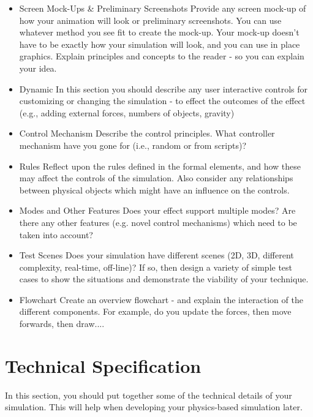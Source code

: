 \documentclass[conference]{acmsiggraph}
\begin{document}
\begin{itemize}
\item {Screen Mock-Ups \& Preliminary Screenshots}
Provide any screen mock-up of how your animation will look or preliminary screenshots.  You can use whatever method you see fit to create the mock-up.  Your mock-up doesn't have to be exactly how your simulation will look, and you can use in place graphics.  Explain principles and concepts to the reader - so you can explain your idea.
\item {Dynamic}
In this section you should describe any user interactive controls for customizing or changing the simulation - to effect the outcomes of the effect (e.g., adding external forces, numbers of objects, gravity)
\item {Control Mechanism}
Describe the control principles.  What controller mechanism have you gone for (i.e., random or from scripts)?  
\item {Rules}
Reflect upon the rules defined in the formal elements, and how these may affect the controls of the simulation.  Also consider any relationships between physical objects which might have an influence on the controls.
\item {Modes and Other Features}
Does your effect support multiple modes?  Are there any other features (e.g. novel control mechanisms) which need to be taken into account?
\item {Test Scenes}
Does your simulation have different scenes (2D, 3D, different complexity, real-time, off-line)?  If so, then design a variety of simple test cases to show the situations and demonstrate the viability of your technique.
\item {Flowchart}
Create an overview flowchart - and explain the interaction of the different components.  For example, do you update the forces, then move forwards, then draw....
\end{itemize}

\section{Technical Specification}

In this section, you should put together some of the technical details of your simulation.  This will help when developing your physics-based simulation later.
\end{document}
